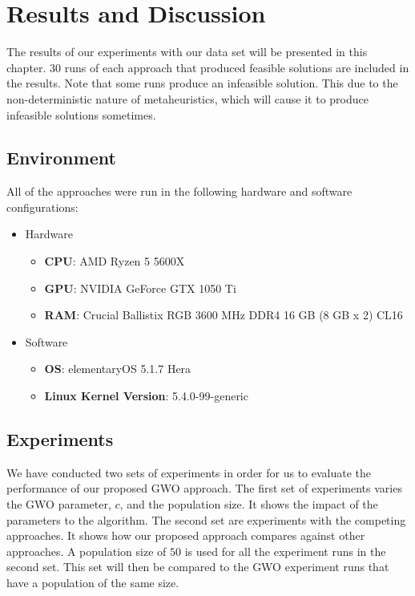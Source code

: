 \chapter{Results and Discussion}
The results of our experiments with our data set will be presented in this chapter. 30 runs of each approach that produced feasible solutions are included in the results. Note that some runs produce an infeasible solution. This due to the non-deterministic nature of metaheuristics, which will cause it to produce infeasible solutions sometimes.

\section{Environment}
All of the approaches were run in the following hardware and software configurations:

\begin{itemize}
	\item Hardware
	\begin{itemize}
		\item \textbf{CPU}: AMD Ryzen 5 5600X
		\item \textbf{GPU}: NVIDIA GeForce GTX 1050 Ti
		\item \textbf{RAM}: Crucial Ballistix RGB 3600 MHz DDR4 16 GB (8 GB x 2) CL16
	\end{itemize}
	\item Software
	\begin{itemize}
		\item \textbf{OS}: elementaryOS 5.1.7 Hera
		\item \textbf{Linux Kernel Version}: 5.4.0-99-generic
	\end{itemize}
\end{itemize}

\section{Experiments}
We have conducted two sets of experiments in order for us to evaluate the performance of our proposed GWO approach. The first set of experiments varies the GWO parameter, $c$, and the population size. It shows the impact of the parameters to the algorithm. The second set are experiments with the competing approaches. It shows how our proposed approach compares against other approaches. A population size of $50$ is used for all the experiment runs in the second set. This set will then be compared to the GWO experiment runs that have a population of the same size.

